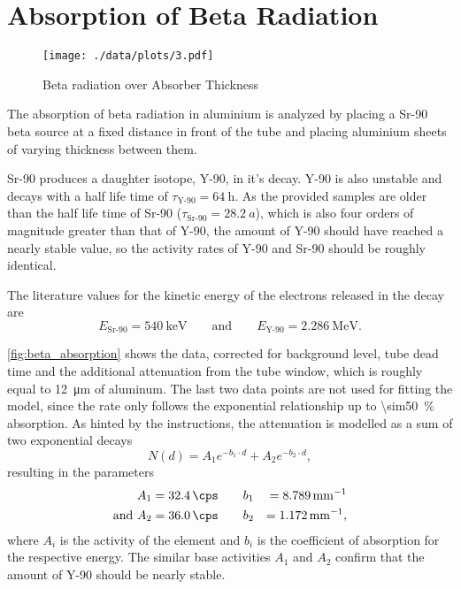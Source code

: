\chapter{Absorption of Beta Radiation}

\begin{figure}[ht!]
	\centering
	\texttt{[image: ./data/plots/3.pdf]}
	\caption{Beta radiation over Absorber Thickness}
	\label{fig:beta_absorption}
\end{figure}

The absorption of beta radiation in aluminium is analyzed by placing a Sr-90 beta source at a fixed distance in front of the tube and placing aluminium sheets of varying thickness between them.

Sr-90 produces a daughter isotope, Y-90, in it's decay. Y-90 is also unstable and decays with a half life time of $\tau_\text{Y-90} = \SI{64}{\hour}$.
As the provided samples are older than the half life time of Sr-90 ($\tau_\text{Sr-90} = \SI{28.2}{a}$), which is also four orders of magnitude greater than that of Y-90, the amount of Y-90 should have reached a nearly stable value, so the activity rates of Y-90 and Sr-90 should be roughly identical.

The literature values for the kinetic energy of the electrons released in the decay are
\begin{equation*}
	E_\text{Sr-90} = \SI{540}{\keV} \qquad \text{and} \qquad E_\text{Y-90} = \SI{2.286}{\MeV}.
\end{equation*}

\autoref{fig:beta_absorption} shows the data, corrected for background level, tube dead time and the additional attenuation from the tube window, which is roughly equal to \SI{12}{\micro\meter} of aluminum.
The last two data points are not used for fitting the model, since the rate only follows the exponential relationship up to \SI{\sim50}{\percent} absorption.
As hinted by the instructions, the attenuation is modelled as a sum of two exponential decays
\begin{equation*}
	N(d) = A_1 e^{-b_1 \cdot d} + A_2 e^{-b_2 \cdot d},
\end{equation*}
resulting in the parameters
\begin{alignat*}{2}
	A_1 &= \SI{32.4}{\cps} \qquad b_1 &= \SI{8.789}{\milli\meter^{-1}}\\
	\text{and } A_2 &= \SI{36.0}{\cps} \qquad b_2 &= \SI{1.172}{\milli\meter^{-1}},
\end{alignat*}
where $A_i$ is the activity of the element and $b_i$ is the coefficient of absorption for the respective energy.
The similar base activities $A_1$ and $A_2$ confirm that the amount of Y-90 should be nearly stable.

